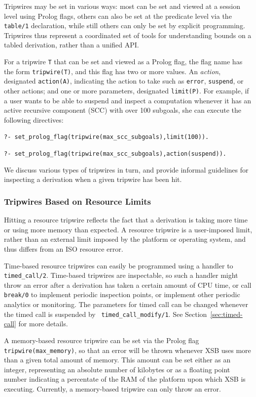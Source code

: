 Tripwires may be set in various ways: most can be set and viewed at a
session level using Prolog flags, others can also be set at the
predicate level via the {\tt table/1} declaration, while still others
can only be set by explicit programming.  Tripwires thus represent a
coordinated set of tools for understanding bounds on a tabled
derivation, rather than a unified API.

For a tripwire {\tt T} that can be set and viewed as a Prolog flag,
the flag name has the form {\tt tripwire(T)}, and this flag has two or
more values.  An {\em action}, designated {\tt action(A)}, indicating
the action to take such as {\tt error}, {\tt suspend}, or other
actions; and one or more parameters, designated {\tt limit(P)}.
For example, if a user wants to be able to suspend and inspect a
computation whenever it has an active recursive component (SCC) with
over 100 subgoals, she can execute the following directives:

{\tt ?- set\_prolog\_flag(tripwire(max\_scc\_subgoals),limit(100)).}

{\tt ?- set\_prolog\_flag(tripwire(max\_scc\_subgoals),action(suspend)).}

We discuss various types of tripwires in turn, and provide informal
guidelines for inspecting a derivation when a given tripwire has been
hit.

\subsubsection{Tripwires Based on Resource Limits}
%
Hitting a resource tripwire reflects the fact that a derivation is
taking more time or using more memory than expected.  A resource
tripwire is a user-imposed limit, rather than an external limit
imposed by the platform or operating system, and thus differs from an
ISO resource error.

%
Time-based resource tripwires can easily
be programmed using a handler to {\tt timed\_call/2}.  Time-based
tripwires are inspectable, so such a handler might throw an error
after a derivation has taken a certain amount of CPU time, or call
{\tt break/0} to implement periodic inspection points, or implement
other periodic analytics or monitoring.  The parameters for timed call
can be changed whenever the timed call is suspended by {\tt
  timed\_call\_modify/1}.  See Section~\ref{sec:timed-call} for more
details.

A memory-based resource tripwire can be set via the Prolog flag {\tt
  tripwire(max\_memory)}, so that an error will be thrown whenever XSB
uses more than a given total amount of memory.  This amount can be set
either as an integer, representing an absolute number of kilobytes or
as a floating point number indicating a percentate of the RAM of the
platform upon which XSB is executing.  Currently, a memory-based
tripwire can only throw an error.

